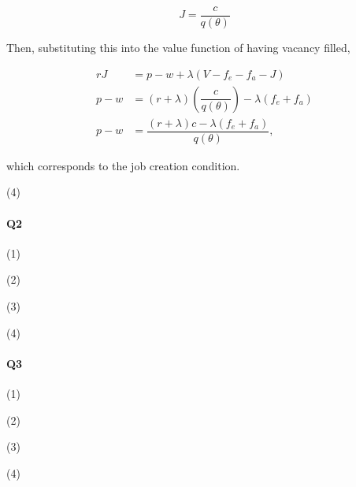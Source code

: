 \documentclass[dvipdfmx, 12pt]{article}
\begin{document}
\[
J = \dfrac{c}{q (\theta)}
\]

Then, substituting this into the value function of having vacancy filled,

\begin{align*}
  rJ &= p - w + \lambda (V - f_e - f_a - J) \\
  p - w &= (r + \lambda) \left( \dfrac{c}{q (\theta)} \right) - \lambda (f_e + f_a) \\
  p - w &= \dfrac{(r + \lambda)c - \lambda (f_e + f_a)}{q (\theta)},
\end{align*}

which corresponds to the job creation condition.

\vspace{1zw}

(4)

\paragraph{Q2} \hspace{1zw}

(1)


\vspace{1zw}

(2)


\vspace{1zw}
(3)


\vspace{1zw}
(4)

\paragraph{Q3} \hspace{1zw}

(1)

\vspace{1zw}
(2)

\vspace{1zw}
(3)

\vspace{1zw}
(4)
\end{document}
